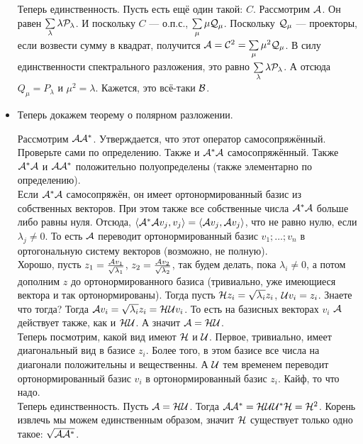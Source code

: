 \documentclass{article}
\begin{document}
\begin{itemize}
\begin{Proof}
            Теперь единственность. Пусть есть ещё один такой: $C$. Рассмотрим ${\mathcal{A}}$. Он равен $\sum\limits_\lambda\lambda{\mathcal{P}}_\lambda$. И поскольку $C$ --- о.п.с., $\sum\limits_\mu\mu{\mathcal{Q}}_\mu$. Поскольку ${\mathcal{Q}}_\mu$ --- проекторы, если возвести сумму в квадрат, получится ${\mathcal{A}}={\mathcal{C}}^2=\sum\limits_\mu\mu^2{\mathcal{Q}}_\mu$. В силу единственности спектрального разложения, это равно $\sum\limits_\lambda\lambda{\mathcal{P}}_\lambda$. А отсюда $Q_\mu=P_\lambda$ и $\mu^2=\lambda$. Кажется, это всё-таки ${\mathcal{B}}$.
        \end{Proof}
        \item[] Теперь докажем теорему о полярном разложении.
        \begin{Proof}
            Рассмотрим ${\mathcal{A}}{\mathcal{A}}^*$. Утверждается, что этот оператор самосопряжённый. Проверьте сами по определению. Также и ${\mathcal{A}}^*{\mathcal{A}}$ самосопряжённый. Также ${\mathcal{A}}^*{\mathcal{A}}$ и ${\mathcal{A}}{\mathcal{A}}^*$ положительно полуопределены (также элементарно по определению).\\
            Если ${\mathcal{A}}^*{\mathcal{A}}$ самосопряжён, он имеет ортонормированный базис из собственных векторов. При этом также все собственные числа ${\mathcal{A}}^*{\mathcal{A}}$ больше либо равны нуля. Отсюда, ${\left\langle{{\mathcal{A}}^*{\mathcal{A}}v_j},{v_j}\right\rangle}={\left\langle{{\mathcal{A}}v_j},{{\mathcal{A}} v_j}\right\rangle}$, что не равно нулю, если $\lambda_j\neq0$. То есть ${\mathcal{A}}$ переводит ортонормированный базис $v_1;\ldots;v_n$ в ортогональную систему векторов (возможно, не полную).\\
            Хорошо, пусть $z_1=\frac{{\mathcal{A}} v_1}{\sqrt{\lambda_1}}$, $z_2=\frac{{\mathcal{A}} v_2}{\sqrt{\lambda_2}}$, так будем делать, пока $\lambda_i\neq0$, а потом дополним $z$ до ортонормированного базиса (тривиально, уже имеющиеся вектора и так ортонормированы). Тогда пусть
            ${\mathcal{H}} z_i=\sqrt{\lambda_i}z_i$, ${\mathcal{U}} v_i=z_i$. Знаете что тогда? Тогда ${\mathcal{A}} v_i=\sqrt{\lambda_i}z_i={\mathcal{H}}{\mathcal{U}} v_i$. То есть на базисных векторах $v_i$ ${\mathcal{A}}$ действует также, как и ${\mathcal{H}}{\mathcal{U}}$. А значит ${\mathcal{A}}={\mathcal{H}}{\mathcal{U}}$.\\
            Теперь посмотрим, какой вид имеют ${\mathcal{H}}$ и ${\mathcal{U}}$. Первое, тривиально, имеет диагональный вид в базисе $z_i$. Более того, в этом базисе все числа на диагонали положительны и вещественны. А ${\mathcal{U}}$ тем временем переводит ортонормированный базис $v_i$ в ортонормированный базис $z_i$. Кайф, то что надо.\\
            Теперь единственность. Пусть ${\mathcal{A}}={\mathcal{H}}{\mathcal{U}}$. Тогда ${\mathcal{A}}{\mathcal{A}}^*={\mathcal{H}}{\mathcal{U}}{\mathcal{U}}^*{\mathcal{H}}={\mathcal{H}}^2$. Корень извлечь мы можем единственным образом, значит ${\mathcal{H}}$ существует только одно такое: $\sqrt{{\mathcal{A}}{\mathcal{A}}^*}$.\\

\end{Proof}
\end{itemize}
\end{document}
